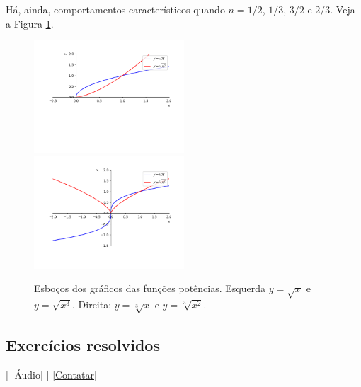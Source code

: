 Há, ainda, comportamentos característicos quando $n=1/2$, $1/3$, $3/2$ e $2/3$. Veja a Figura \ref{fig:funpot_racional}.

\begin{figure}[H]
  \centering
  \includegraphics[width=0.5\textwidth]{./cap_funcao/dados/fig_funpot_racional/fig_funpot_racional_par}~
    \includegraphics[width=0.5\textwidth]{./cap_funcao/dados/fig_funpot_racional/fig_funpot_racional_impar}
  \caption{Esboços dos gráficos das funções potências. Esquerda $y=\sqrt{x}$ e $y=\sqrt{x^3}$. Direita: $y=\sqrt[3]{x}$ e $y=\sqrt[3]{x^2}$.}
  \label{fig:funpot_racional}
\end{figure}


\subsection*{Exercícios resolvidos}

\begin{flushright}
  [Vídeo] | [Áudio] | \href{https://phkonzen.github.io/notas/contato.html}{[Contatar]}
\end{flushright}

